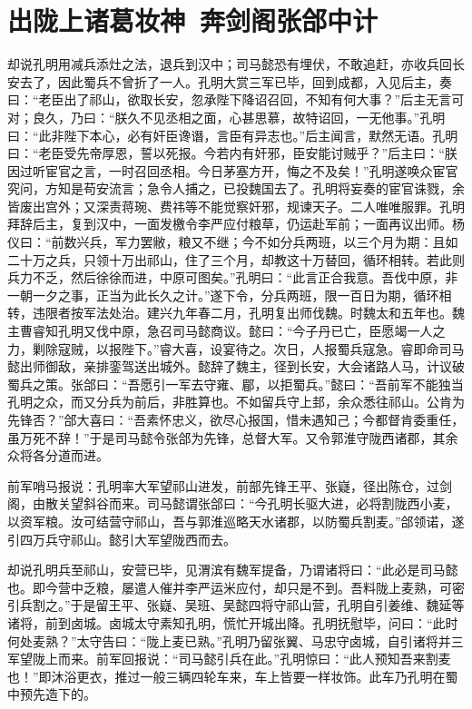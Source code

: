 \chapter{出陇上诸葛妆神~奔剑阁张郃中计}

却说孔明用减兵添灶之法，退兵到汉中；司马懿恐有埋伏，不敢追赶，亦收兵回长安去了，因此蜀兵不曾折了一人。孔明大赏三军已毕，回到成都，入见后主，奏曰：“老臣出了祁山，欲取长安，忽承陛下降诏召回，不知有何大事？”后主无言可对；良久，乃曰：“朕久不见丞相之面，心甚思慕，故特诏回，一无他事。”孔明曰：“此非陛下本心，必有奸臣谗谮，言臣有异志也。”后主闻言，默然无语。孔明曰：“老臣受先帝厚恩，誓以死报。今若内有奸邪，臣安能讨贼乎？”后主曰：“朕因过听宦官之言，一时召回丞相。今日茅塞方开，悔之不及矣！”孔明遂唤众宦官究问，方知是苟安流言；急令人捕之，已投魏国去了。孔明将妄奏的宦官诛戮，余皆废出宫外；又深责蒋琬、费祎等不能觉察奸邪，规谏天子。二人唯唯服罪。孔明拜辞后主，复到汉中，一面发檄令李严应付粮草，仍运赴军前；一面再议出师。杨仪曰：“前数兴兵，军力罢敝，粮又不继；今不如分兵两班，以三个月为期：且如二十万之兵，只领十万出祁山，住了三个月，却教这十万替回，循环相转。若此则兵力不乏，然后徐徐而进，中原可图矣。”孔明曰：“此言正合我意。吾伐中原，非一朝一夕之事，正当为此长久之计。”遂下令，分兵两班，限一百日为期，循环相转，违限者按军法处治。建兴九年春二月，孔明复出师伐魏。时魏太和五年也。魏主曹睿知孔明又伐中原，急召司马懿商议。懿曰：“今子丹已亡，臣愿竭一人之力，剿除寇贼，以报陛下。”睿大喜，设宴待之。次日，人报蜀兵寇急。睿即命司马懿出师御敌，亲排銮驾送出城外。懿辞了魏主，径到长安，大会诸路人马，计议破蜀兵之策。张郃曰：“吾愿引一军去守雍、郿，以拒蜀兵。”懿曰：“吾前军不能独当孔明之众，而又分兵为前后，非胜算也。不如留兵守上邽，余众悉往祁山。公肯为先锋否？”郃大喜曰：“吾素怀忠义，欲尽心报国，惜未遇知己；今都督肯委重任，虽万死不辞！”于是司马懿令张郃为先锋，总督大军。又令郭淮守陇西诸郡，其余众将各分道而进。

前军哨马报说：孔明率大军望祁山进发，前部先锋王平、张嶷，径出陈仓，过剑阁，由散关望斜谷而来。司马懿谓张郃曰：“今孔明长驱大进，必将割陇西小麦，以资军粮。汝可结营守祁山，吾与郭淮巡略天水诸郡，以防蜀兵割麦。”郃领诺，遂引四万兵守祁山。懿引大军望陇西而去。

却说孔明兵至祁山，安营已毕，见渭滨有魏军提备，乃谓诸将曰：“此必是司马懿也。即今营中乏粮，屡遣人催并李严运米应付，却只是不到。吾料陇上麦熟，可密引兵割之。”于是留王平、张嶷、吴班、吴懿四将守祁山营，孔明自引姜维、魏延等诸将，前到卤城。卤城太守素知孔明，慌忙开城出降。孔明抚慰毕，问曰：“此时何处麦熟？”太守告曰：“陇上麦已熟。”孔明乃留张翼、马忠守卤城，自引诸将并三军望陇上而来。前军回报说：“司马懿引兵在此。”孔明惊曰：“此人预知吾来割麦也！”即沐浴更衣，推过一般三辆四轮车来，车上皆要一样妆饰。此车乃孔明在蜀中预先造下的。


